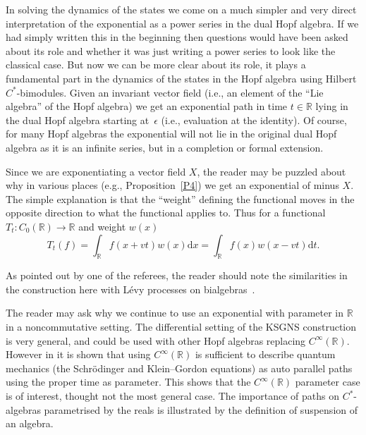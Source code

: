 \documentclass[10pt,a4paper]{amsart}
\numberwithin{equation}{section}
\newcommand{\extd}{\mathrm{d}}
\newcommand{\R}{\mathbb{R}}
\newcommand{\<}{\langle}
\renewcommand{\>}{\rangle}
\begin{document}
 In solving the dynamics of the states we come on a much simpler and very direct interpretation of the exponential as a power series in the dual Hopf algebra. If we had simply written this in the beginning then questions would have been asked about its role and whether it was just writing a power series to look like the classical case. But now we can be more clear about its role, it plays a fundamental part in the dynamics of the states in the Hopf algebra using Hilbert $ C^{*} $-bimodules. Given an invariant vector field (i.e., an element of the ``Lie algebra'' of the Hopf algebra) we get an exponential path in time $ t\in \R $ lying in the dual Hopf algebra starting at~$ \epsilon $ (i.e., evaluation at the identity). Of course, for many Hopf algebras the exponential will not lie in the original dual Hopf algebra as it is an infinite series, but in a completion or formal extension.

Since we are exponentiating a vector field $ X $, the reader may be puzzled about why in various places (e.g., Proposition~\ref{P4}) we get an exponential of minus $ X $. The simple explanation is that the ``weight'' defining the functional moves in the opposite direction to what the functional applies to. Thus for a functional $ T_{t}\colon C_{0}(\R) \rightarrow \R $ and weight $ w(x) $
\[T_{t}(f)=\int_{\R} f(x+v t) w(x) \extd x=\int_{\R} f(x) w (x-vt)\extd t. \]

As pointed out by one of the referees, the reader should note the similarities in the construction here with L\'evy processes on bialgebras~\cite{Uwe-Franz}.
		
 The reader may ask why we continue to use an exponential with parameter in $ \R $ in a noncommutative setting. The differential setting of the KSGNS construction is very general, and could be used with other Hopf algebras replacing $C^{\infty}(\R)$. However in \cite{BegMa:geo} it is shown that using $ C^{\infty}(\R) $ is sufficient to describe quantum mechanics (the Schr\"odinger and Klein--Gordon equations) as auto parallel paths using the proper time as parameter. This shows that the $ C^{\infty}(\R) $ parameter case is of interest, thought not the most general case. The importance of paths on $ C^{*} $-algebras parametrised by the reals is illustrated by the definition of suspension of an algebra.
\end{document}
